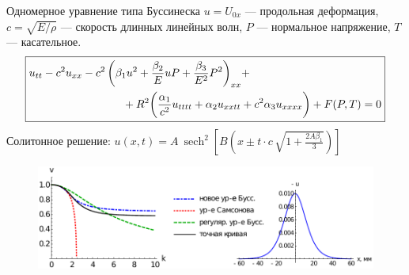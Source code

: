 \documentclass[usenames,dvipsnames]{beamer}
\DeclareMathOperator{\sech}{sech}
\begin{document}
\begin{frame}{Одномерное уравнение типа Буссинеска}
$u = U_{0x}$ --- продольная деформация, $c = \sqrt{E/\rho}$ --- скорость длинных линейных волн, $P$ --- нормальное напряжение, $T$ --- касательное.
\small
\begin{equation*}
\boxed{\begin{split}
&u_{tt} - c^2 u_{xx} - {\color{black}c^2\left(\beta_1 u^2 + \frac{\beta_2}{E} u P + \frac{\beta_3}{E^2} P^2\right)_{xx}} +\\
&\hspace{30mm} + {\color{black}R^2 \bigg(\frac{\alpha_1}{c^2} u_{tttt} + \alpha_2 u_{xxtt} + c^2\alpha_3 u_{xxxx} \bigg)} + F(P, T) = 0
\end{split}}
\end{equation*}
\normalsize 
Солитонное решение: $u(x,t) = A\ \sech^2\left[B \left(x\pm t\cdot c\,\sqrt{1+\frac{2A \beta_1}{3}}\right) \right]$
\begin{figure}
\vspace{-6mm}
\includegraphics[width=1.02\linewidth]{figures/Disp_Sol}
\end{figure}

\end{frame}
\end{document}
